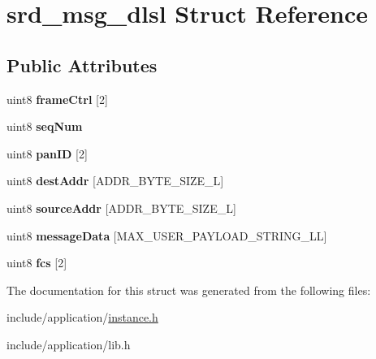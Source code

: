\hypertarget{structsrd__msg__dlsl}{\section{srd\-\_\-msg\-\_\-dlsl Struct Reference}
\label{structsrd__msg__dlsl}
}
\subsection*{Public Attributes}
\begin{DoxyCompactItemize}
\item 
\hypertarget{structsrd__msg__dlsl_aa3271210b132f117d2e2205a0a220419}{uint8 {\bfseries frame\-Ctrl} \mbox{[}2\mbox{]}}\label{structsrd__msg__dlsl_aa3271210b132f117d2e2205a0a220419}

\item 
\hypertarget{structsrd__msg__dlsl_a637ff0754fa7f29e0b25992b6f588963}{uint8 {\bfseries seq\-Num}}\label{structsrd__msg__dlsl_a637ff0754fa7f29e0b25992b6f588963}

\item 
\hypertarget{structsrd__msg__dlsl_aa91ba9824ac34956f81aeb0a08c7a96f}{uint8 {\bfseries pan\-I\-D} \mbox{[}2\mbox{]}}\label{structsrd__msg__dlsl_aa91ba9824ac34956f81aeb0a08c7a96f}

\item 
\hypertarget{structsrd__msg__dlsl_afcc7f9cddaee34e7e0943920691fa7f0}{uint8 {\bfseries dest\-Addr} \mbox{[}A\-D\-D\-R\-\_\-\-B\-Y\-T\-E\-\_\-\-S\-I\-Z\-E\-\_\-\-L\mbox{]}}\label{structsrd__msg__dlsl_afcc7f9cddaee34e7e0943920691fa7f0}

\item 
\hypertarget{structsrd__msg__dlsl_aca59c87cbe7ee9ed5520ad040b7662a9}{uint8 {\bfseries source\-Addr} \mbox{[}A\-D\-D\-R\-\_\-\-B\-Y\-T\-E\-\_\-\-S\-I\-Z\-E\-\_\-\-L\mbox{]}}\label{structsrd__msg__dlsl_aca59c87cbe7ee9ed5520ad040b7662a9}

\item 
\hypertarget{structsrd__msg__dlsl_aa421d1ed3f77b72b718166a359dd5ced}{uint8 {\bfseries message\-Data} \mbox{[}M\-A\-X\-\_\-\-U\-S\-E\-R\-\_\-\-P\-A\-Y\-L\-O\-A\-D\-\_\-\-S\-T\-R\-I\-N\-G\-\_\-\-L\-L\mbox{]}}\label{structsrd__msg__dlsl_aa421d1ed3f77b72b718166a359dd5ced}

\item 
\hypertarget{structsrd__msg__dlsl_a7f340a37055306d6559f1236d2a1b980}{uint8 {\bfseries fcs} \mbox{[}2\mbox{]}}\label{structsrd__msg__dlsl_a7f340a37055306d6559f1236d2a1b980}

\end{DoxyCompactItemize}


The documentation for this struct was generated from the following files\-:\begin{DoxyCompactItemize}
\item 
include/application/\hyperlink{instance_8h}{instance.\-h}\item 
include/application/lib.\-h\end{DoxyCompactItemize}
